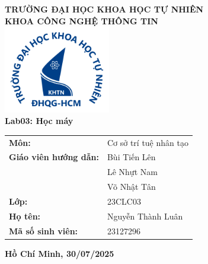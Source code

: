 \documentclass[12pt, a4paper]{article}
\begin{document}
\begin{titlepage}
    \centering
    \fontsize{16pt}{18pt}\selectfont
    \textbf{TRƯỜNG ĐẠI HỌC KHOA HỌC TỰ NHIÊN} \\
    \textbf{KHOA CÔNG NGHỆ THÔNG TIN} \\[1cm]

    \includegraphics[width=0.35\textwidth]{img/logohcmus.png} \\[1cm]

    {\fontsize{24pt}{26pt}\selectfont \textbf{Lab03: Học máy}} \\[1cm]

    \vspace{0.5cm}

    \begin{center}
        \renewcommand{\arraystretch}{1.2}
        \begin{tabular}{@{}ll}
            \textbf{Môn:} & Cơ sở trí tuệ nhân tạo \\[13pt]
            \textbf{Giáo viên hướng dẫn:} & Bùi Tiến Lên \\
                                          & Lê Nhựt Nam \\
                                          & Võ Nhật Tân\\[13pt]
            \textbf{Lớp:} & 23CLC03 \\[13pt]
            \textbf{Họ tên:} & Nguyễn Thành Luân \\[13pt]
            \textbf{Mã số sinh viên:} & 23127296 \\[13pt]
        \end{tabular}
    \end{center}

    \vfill

    {\Large \textbf{Hồ Chí Minh, 30/07/2025}}
\end{titlepage}

\tableofcontents
\newpage
\end{document}
